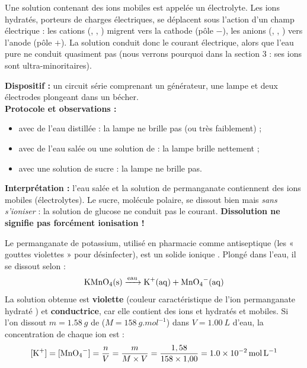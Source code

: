 \documentclass[11pt]{article}
\newcommand{\cle}[1]{{\popxbold\color{popdark}#1}}
\begin{document}
Une solution contenant des ions mobiles est appelée un \cle{électrolyte}. Les ions hydratés, porteurs de charges électriques, se déplacent sous l'action d'un champ électrique : les cations (, , ) migrent vers la cathode (pôle $-$), les anions (, , ) vers l'anode (pôle $+$). La solution conduit donc le courant électrique, alors que l'eau pure ne conduit quasiment pas (nous verrons pourquoi dans la section 3 : ses ions sont ultra-minoritaires).

\begin{experience}
\textbf{Dispositif :} un circuit série comprenant un générateur, une lampe et deux électrodes plongeant dans un bécher.\\
\textbf{Protocole et observations :}
\begin{itemize}
  \item avec de l'eau distillée : la lampe ne brille pas (ou très faiblement) ;
  \item avec de l'eau salée ou une solution de  : la lampe brille nettement ;
  \item avec une solution de sucre : la lampe ne brille pas.
\end{itemize}
\textbf{Interprétation :} l'eau salée et la solution de permanganate contiennent des ions mobiles (électrolytes). Le sucre, molécule polaire, se dissout bien mais \emph{sans s'ioniser} : la solution de glucose ne conduit pas le courant. \textbf{Dissolution ne signifie pas forcément ionisation !}
\end{experience}

\begin{exemplebox}
Le permanganate de potassium, utilisé en pharmacie comme antiseptique (les « gouttes violettes » pour désinfecter), est un solide ionique . Plongé dans l'eau, il se dissout selon :
\[ \ce{KMnO4(s) ->[eau] K+(aq) + MnO4-(aq)} \]
La solution obtenue est \textbf{violette} (couleur caractéristique de l'ion permanganate hydraté ) et \textbf{conductrice}, car elle contient des ions  et  hydratés et mobiles. Si l'on dissout $m = \SI{1,58}{g}$ de  ($M = \SI{158}{g.mol^{-1}}$) dans $V = \SI{1,00}{L}$ d'eau, la concentration de chaque ion est :
\[ [\ce{K+}] = [\ce{MnO4-}] = \frac{n}{V} = \frac{m}{M \times V} = \frac{1,58}{158 \times 1{,}00} = \SI{1,0e-2}{mol.L^{-1}} \]
\end{exemplebox}
\end{document}
